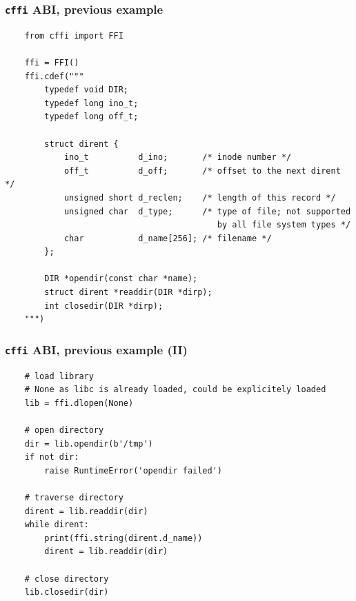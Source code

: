 \documentclass{beamer}
\begin{document}
\begin{frame}[fragile]
  \frametitle{\texttt{cffi} ABI, previous example}

  \begin{verbatim}
    from cffi import FFI

    ffi = FFI()
    ffi.cdef("""
        typedef void DIR;
        typedef long ino_t;
        typedef long off_t;

        struct dirent {
            ino_t          d_ino;       /* inode number */
            off_t          d_off;       /* offset to the next dirent */
            unsigned short d_reclen;    /* length of this record */
            unsigned char  d_type;      /* type of file; not supported
                                           by all file system types */
            char           d_name[256]; /* filename */
        };

        DIR *opendir(const char *name);
        struct dirent *readdir(DIR *dirp);
        int closedir(DIR *dirp);
    """)
  \end{verbatim}
\end{frame}

\begin{frame}[fragile]
  \frametitle{\texttt{cffi} ABI, previous example (II)}

  \begin{verbatim}
    # load library
    # None as libc is already loaded, could be explicitely loaded
    lib = ffi.dlopen(None)

    # open directory
    dir = lib.opendir(b'/tmp')
    if not dir:
        raise RuntimeError('opendir failed')

    # traverse directory
    dirent = lib.readdir(dir)
    while dirent:
        print(ffi.string(dirent.d_name))
        dirent = lib.readdir(dir)

    # close directory
    lib.closedir(dir)
  \end{verbatim}
\end{frame}
\end{document}

